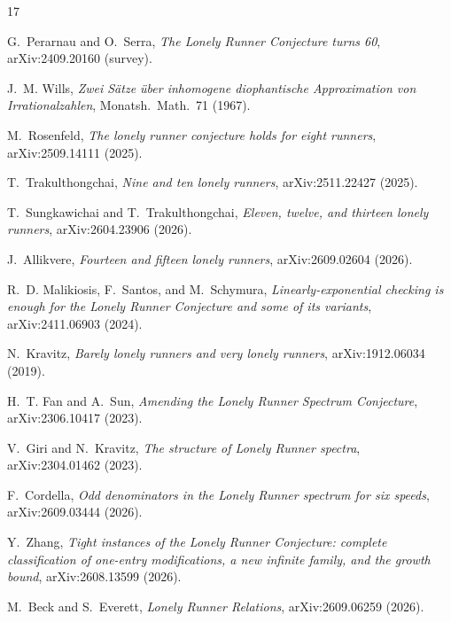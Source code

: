 
\begingroup\sloppy\raggedright
\begin{thebibliography}{17}

G.~Perarnau and O.~Serra,
\emph{The Lonely Runner Conjecture turns 60},
arXiv:2409.20160 (survey).

J.~M. Wills,
\emph{Zwei S\"atze \"uber inhomogene diophantische Approximation von
Irrationalzahlen},
Monatsh.\ Math.\ 71 (1967).

M.~Rosenfeld,
\emph{The lonely runner conjecture holds for eight runners},
arXiv:2509.14111 (2025).

T.~Trakulthongchai,
\emph{Nine and ten lonely runners},
arXiv:2511.22427 (2025).

T.~Sungkawichai and T.~Trakulthongchai,
\emph{Eleven, twelve, and thirteen lonely runners},
arXiv:2604.23906 (2026).

J.~Allikvere,
\emph{Fourteen and fifteen lonely runners},
arXiv:2609.02604 (2026).

R.~D. Malikiosis, F.~Santos, and M.~Schymura,
\emph{Linearly-exponential checking is enough for the Lonely Runner
Conjecture and some of its variants},
arXiv:2411.06903 (2024).

N.~Kravitz,
\emph{Barely lonely runners and very lonely runners},
arXiv:1912.06034 (2019).

H.~T. Fan and A.~Sun,
\emph{Amending the Lonely Runner Spectrum Conjecture},
arXiv:2306.10417 (2023).

V.~Giri and N.~Kravitz,
\emph{The structure of Lonely Runner spectra},
arXiv:2304.01462 (2023).

F.~Cordella,
\emph{Odd denominators in the Lonely Runner spectrum for six speeds},
arXiv:2609.03444 (2026).

Y.~Zhang,
\emph{Tight instances of the Lonely Runner Conjecture: complete
classification of one-entry modifications, a new infinite family, and the
growth bound},
arXiv:2608.13599 (2026).

M.~Beck and S.~Everett,
\emph{Lonely Runner Relations},
arXiv:2609.06259 (2026).


\end{thebibliography}
